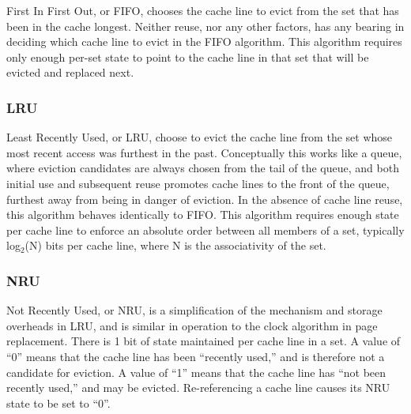 First In First Out, or FIFO, chooses the cache line to evict from the set that has been in the cache longest.  Neither reuse, nor any other factors, has any bearing in deciding which cache line to evict in the FIFO algorithm.  This algorithm requires only enough per-set state to point to the cache line in that set that will be evicted and replaced next.
\subsubsection{LRU}

Least Recently Used, or LRU, choose to evict the cache line from the set whose most recent access was furthest in the past.  Conceptually this works like a queue, where eviction candidates are always chosen from the tail of the queue, and both initial use and subsequent reuse promotes cache lines to the front of the queue, furthest away from being in danger of eviction. In the absence of cache line reuse, this algorithm behaves identically to FIFO.  This algorithm requires enough state per cache line to enforce an absolute order between all members of a set, typically log$_2$(N) bits per cache line, where N is the associativity of the set.

\subsubsection{NRU}

Not Recently Used, or NRU, is a simplification of the mechanism and storage overheads in LRU, and is similar in operation to the clock algorithm in page replacement.  There is 1 bit of state maintained per cache line in a set.  A value of ``0'' means that the cache line has been ``recently used,'' and is therefore not a candidate for eviction.  A value of ``1'' means that the cache line has ``not been recently used,'' and may be evicted.  Re-referencing a cache line causes its NRU state to be set to ``0''.

